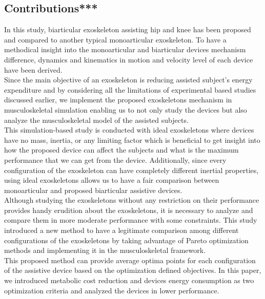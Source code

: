 \documentclass[10pt,letterpaper]{article}
\begin{document}
\subsection*{Contributions***}
In this study, biarticular exoskeleton assisting hip and knee has been proposed and compared to another typical monoarticular exoskeleton. To have a methodical insight into the monoarticular and biarticular devices mechanism difference, dynamics and kinematics in motion and velocity level of each device have been derived.\\
Since the main objective of an exoskeleton is reducing assisted subject's energy expenditure \cite{} and by considering all the limitations of experimental based studies discussed earlier, we implement the proposed exoskeletons mechanism in musculoskeletal simulation enabling us to not only study the devices but also analyze the musculoskeletal model of the assisted subjects.\\
This simulation-based study is conducted with ideal exoskeletons where devices have no mass, inertia, or any limiting factor which is beneficial to get insight into how the proposed device can affect the subjects and what is the maximum performance that we can get from the device. Additionally, since every configuration of the exoskeleton can have completely different inertial properties, using ideal exoskeletons allows us to have a fair comparison between monoarticular and proposed biarticular assistive devices.\\
Although studying the exoskeletons without any restriction on their performance provides handy erudition about the exoskeletons, it is necessary to analyze and compare them in more moderate performance with some constraints. This study introduced a new method to have a legitimate comparison among different configurations of the exoskeletons by taking advantage of Pareto optimization methods and implementing it in the musculoskeletal framework.\\
This proposed method can provide average optima points for each configuration of the assistive device based on the optimization defined objectives. In this paper, we introduced metabolic cost reduction and devices energy consumption as two optimization criteria and analyzed the devices in lower performance.\\
\end{document}
